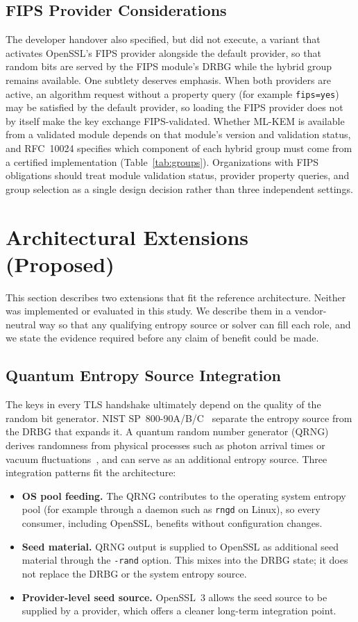\documentclass[conference]{IEEEtran}
\begin{document}
\subsection{FIPS Provider Considerations}\label{sec:fips}
The developer handover also specified, but did not execute, a variant that activates OpenSSL's FIPS provider alongside the default provider, so that random bits are served by the FIPS module's DRBG while the hybrid group remains available. One subtlety deserves emphasis. When both providers are active, an algorithm request without a property query (for example \texttt{fips=yes}) may be satisfied by the default provider, so loading the FIPS provider does not by itself make the key exchange FIPS-validated. Whether ML-KEM is available from a validated module depends on that module's version and validation status, and RFC~10024 specifies which component of each hybrid group must come from a certified implementation (Table~\ref{tab:groups}). Organizations with FIPS obligations should treat module validation status, provider property queries, and group selection as a single design decision rather than three independent settings.

\section{Architectural Extensions (Proposed)}
\label{sec:extensions}

This section describes two extensions that fit the reference architecture. Neither was implemented or evaluated in this study. We describe them in a vendor-neutral way so that any qualifying entropy source or solver can fill each role, and we state the evidence required before any claim of benefit could be made.

\subsection{Quantum Entropy Source Integration}
The keys in every TLS handshake ultimately depend on the quality of the random bit generator. NIST SP~800-90A/B/C~\cite{sp80090a,sp80090b,sp80090c} separate the entropy source from the DRBG that expands it. A quantum random number generator (QRNG) derives randomness from physical processes such as photon arrival times or vacuum fluctuations~\cite{qrngreview}, and can serve as an additional entropy source. Three integration patterns fit the architecture:
\begin{itemize}
  \item \textbf{OS pool feeding.} The QRNG contributes to the operating system entropy pool (for example through a daemon such as \texttt{rngd} on Linux), so every consumer, including OpenSSL, benefits without configuration changes.
  \item \textbf{Seed material.} QRNG output is supplied to OpenSSL as additional seed material through the \texttt{-rand} option. This mixes into the DRBG state; it does not replace the DRBG or the system entropy source.
  \item \textbf{Provider-level seed source.} OpenSSL~3 allows the seed source to be supplied by a provider, which offers a cleaner long-term integration point.
\end{itemize}
\end{document}
